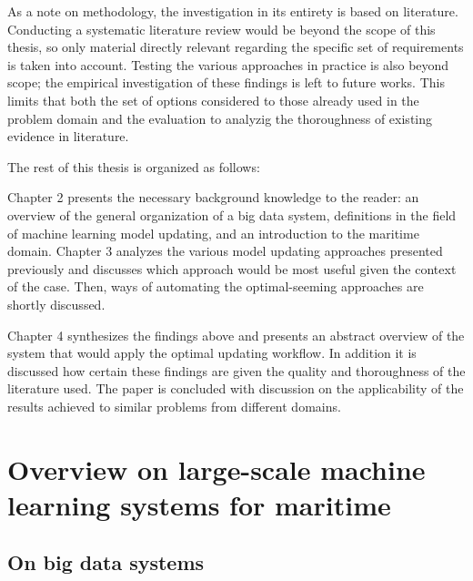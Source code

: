 

As a note on methodology, the investigation in its entirety is based on literature. Conducting a systematic literature review would be beyond the scope of this thesis, so only material directly relevant regarding the specific set of requirements is taken into account. Testing the various approaches in practice is also beyond scope; the empirical investigation of these findings is left to future works. This limits that both the set of options considered to those already used in the problem domain and the evaluation to analyzig the thoroughness of existing evidence in literature.


The rest of this thesis is organized as follows:

Chapter 2 presents the necessary background knowledge to the reader: an overview of the general organization of a big data system, definitions in the field of machine learning model updating, and an introduction to the maritime domain. Chapter 3 analyzes the various model updating approaches presented previously and discusses which approach would be most useful given the context of the case. Then, ways of automating the optimal-seeming approaches are shortly discussed. 

Chapter 4 synthesizes the findings above and presents an abstract overview of the system that would apply the optimal updating workflow. In addition it is discussed how certain these findings are given the quality and thoroughness of the literature used. The paper is concluded with discussion on the applicability of the results achieved to similar problems from different domains.

\chapter{Overview on large-scale machine learning systems for maritime}


\section{On big data systems}

